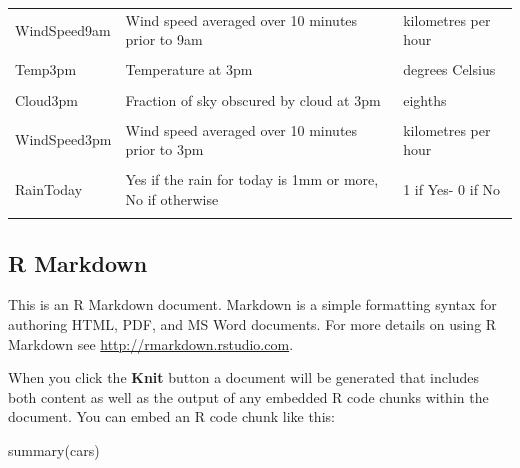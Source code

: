 \documentclass[
  landscape]{article}
\newenvironment{Shaded}{\begin{snugshade}}{\end{snugshade}}
\newcommand{\FunctionTok}[1]{\textcolor[rgb]{0.00,0.00,0.00}{#1}}
\newcommand{\NormalTok}[1]{#1}
\begin{document}
\begin{longtable}[l]{lll}
WindSpeed9am & Wind speed averaged over 10 minutes prior to 9am & kilometres per hour\\
\cellcolor{gray!15}{Pressure9am} & \cellcolor{gray!15}{Atmospheric pressure reduced to mean sea level at 9am} & \cellcolor{gray!15}{hectopascals}\\
Temp3pm & Temperature at 3pm & degrees Celsius\\
\cellcolor{gray!15}{Humidity3pm} & \cellcolor{gray!15}{Relative humidity at 3pm} & \cellcolor{gray!15}{percent}\\
Cloud3pm & Fraction of sky obscured by cloud at 3pm & eighths\\
\cellcolor{gray!15}{WindDir3pm} & \cellcolor{gray!15}{Wind direction averaged over 10 minutes prior to 3pm} & \cellcolor{gray!15}{16 compass points}\\
WindSpeed3pm & Wind speed averaged over 10 minutes prior to 3pm & kilometres per hour\\
\cellcolor{gray!15}{Pressure3pm} & \cellcolor{gray!15}{Atmospheric pressure reduced to mean sea level at 3pm} & \cellcolor{gray!15}{hectopascals}\\
RainToday & Yes if the rain for today is 1mm or more, No if otherwise & 1 if Yes- 0 if No\\
\cellcolor{gray!15}{RainTomorrow} & \cellcolor{gray!15}{Yes if the rain for tomorrow is 1mm or more, No if otherwise  (target variable to predict )} & \cellcolor{gray!15}{1 if Yes- 0 if No}\\*
\end{longtable}

\hypertarget{r-markdown}{%
\subsection{R Markdown}\label{r-markdown}}

This is an R Markdown document. Markdown is a simple formatting syntax
for authoring HTML, PDF, and MS Word documents. For more details on
using R Markdown see \url{http://rmarkdown.rstudio.com}.

When you click the \textbf{Knit} button a document will be generated
that includes both content as well as the output of any embedded R code
chunks within the document. You can embed an R code chunk like this:

\begin{Shaded}
\begin{Highlighting}[]
\FunctionTok{summary}\NormalTok{(cars)}
\end{Highlighting}
\end{Shaded}
\end{document}
